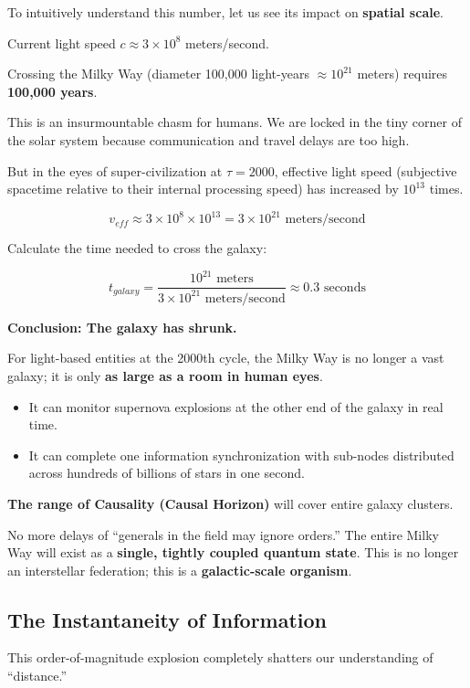 To intuitively understand this number, let us see its impact on \textbf{spatial scale}.

Current light speed $c \approx 3 \times 10^8$ meters/second.

Crossing the Milky Way (diameter 100,000 light-years $\approx 10^{21}$ meters) requires \textbf{100,000 years}.

This is an insurmountable chasm for humans. We are locked in the tiny corner of the solar system because communication and travel delays are too high.

But in the eyes of super-civilization at $\tau = 2000$, effective light speed (subjective spacetime relative to their internal processing speed) has increased by $10^{13}$ times.

\[v_{eff} \approx 3 \times 10^8 \times 10^{13} = 3 \times 10^{21} \text{ meters/second}\]

Calculate the time needed to cross the galaxy:

\[t_{galaxy} = \frac{10^{21} \text{ meters}}{3 \times 10^{21} \text{ meters/second}} \approx 0.3 \text{ seconds}\]

\textbf{Conclusion: The galaxy has shrunk.}

For light-based entities at the 2000th cycle, the Milky Way is no longer a vast galaxy; it is only \textbf{as large as a room in human eyes}.

\begin{itemize}
\item It can monitor supernova explosions at the other end of the galaxy in real time.

\item It can complete one information synchronization with sub-nodes distributed across hundreds of billions of stars in one second.
\end{itemize}

\textbf{The range of Causality (Causal Horizon)} will cover entire galaxy clusters.

No more delays of ``generals in the field may ignore orders.'' The entire Milky Way will exist as a \textbf{single, tightly coupled quantum state}. This is no longer an interstellar federation; this is a \textbf{galactic-scale organism}.

\subsection{The Instantaneity of Information}

This order-of-magnitude explosion completely shatters our understanding of ``distance.''

